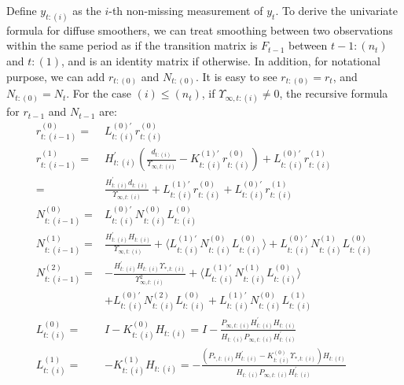 \documentclass[10pt]{article}
\numberwithin{equation}{section}
\begin{document}
Define $y_{t:(i)}$ as the $i$-th non-missing measurement of $y_t$. To derive the univariate formula for diffuse smoothers, we can treat smoothing between two observations within the same period as if the transition matrix is $F_{t-1}$ between $t-1:(n_t)$ and $t:(1)$, and is an identity matrix if otherwise. In addition, for notational purpose, we can add $r_{t:(0)}$ and $N_{t:(0)}$. It is easy to see $r_{t:(0)}=r_t$, and $N_{t:(0)}=N_t$. For the case $(i)\leq(n_t)$, if $\Upsilon_{\infty,t:(i)}\neq0$, the recursive formula for $r_{t-1}$ and $N_{t-1}$ are:
\begin{align}
    r_{t:(i-1)}^{(0)} =& L_{t:(i)}^{(0)'}r_{t:(i)}^{(0)} \label{eq:diff_uni_start} \\
    r_{t:(i-1)}^{(1)} =& H_{t:(i)}^{'}\left(\frac{d_{t:(i)}}{\Upsilon_{\infty,t:(i)}}-K_{t:(i)}^{(1)'}r_{t:(i)}^{(0)}\right)+L_{t:(i)}^{(0)'}r_{t:(i)}^{(1)} \nonumber \\
    =& \frac{H_{t:(i)}^{'}d_{t:(i)}}{\Upsilon_{\infty,t:(i)}} + L_{t:(i)}^{(1)'}r_{t:(i)}^{(0)} + L_{t:(i)}^{(0)'}r_{t:(i)}^{(1)} \\
    N_{t:(i-1)}^{(0)} =& L_{t:(i)}^{(0)'}N_{t:(i)}^{(0)}L_{t:(i)}^{(0)} \\
    N_{t:(i-1)}^{(1)} =& \frac{H_{t:(i)}^{'}H_{t:(i)}}{\Upsilon_{\infty,t:(i)}} + \langle L_{t:(i)}^{(1)'}N_{t:(i)}^{(0)}L_{t:(i)}^{(0)}\rangle + L_{t:(i)}^{(0)'}N_{t:(i)}^{(1)}L_{t:(i)}^{(0)} \\
    N_{t:(i-1)}^{(2)} =& -\frac{H_{t:(i)}^{'}H_{t:(i)}\Upsilon_{*,t:(i)}}{\Upsilon_{\infty,t:(i)}^{2}} + \langle L_{t:(i)}^{(1)'}N_{t:(i)}^{(1)}L_{t:(i)}^{(0)}\rangle \nonumber \\
    &+L_{t:(i)}^{(0)'}N_{t:(i)}^{(2)}L_{t:(i)}^{(0)} + L_{t:(i)}^{(1)'}N_{t:(i)}^{(0)}L_{t:(i)}^{(1)} \\
    L_{t:(i)}^{(0)} =& I-K_{t:(i)}^{(0)}H_{t:(i)}= I-\frac{P_{\infty,t:(i)}H_{t:(i)}^{'}H_{t:(i)}}{H_{t:(i)}P_{\infty,t:(i)}H_{t:(i)}^{'}} \\
    L_{t:(i)}^{(1)} =& - K_{t:(i)}^{(1)}H_{t:(i)}=-\frac{(P_{*,t:(i)}H_{t:(i)}^{'}-K_{t:(i)}^{(0)}\Upsilon_{*,t:(i)})H_{t:(t)}}{H_{t:(i)}P_{\infty,t:(i)}H_{t:(i)}^{'}}
\end{align}
\end{document}
